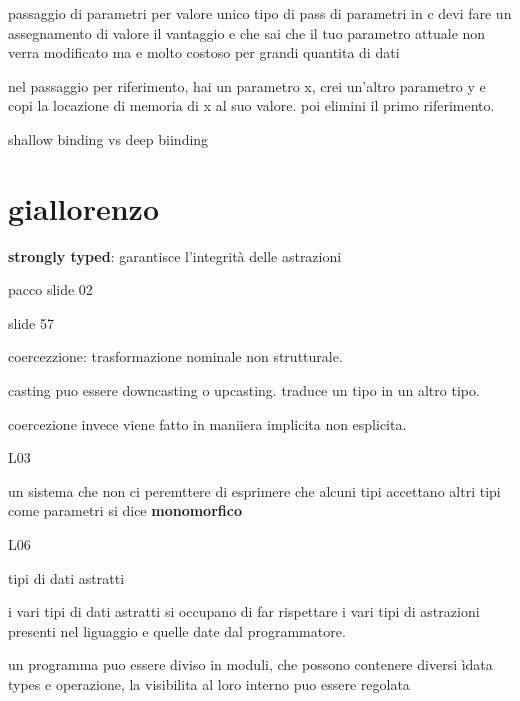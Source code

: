 \documentclass[12pt]{article}
\begin{document}
 passaggio di parametri per valore unico tipo di pass di parametri in c
 devi fare un assegnamento di valore
 il vantaggio e che sai che il tuo parametro attuale non verra modificato
 ma e molto costoso per grandi quantita di dati


nel passaggio per riferimento, hai un parametro x, crei un'altro parametro y e copi la locazione di memoria di x al suo valore. poi elimini il primo riferimento.

shallow binding vs deep biinding



\section{giallorenzo}

\textbf{strongly typed}: garantisce l'integrità delle astrazioni

 pacco slide 02

slide 57

coercezzione: trasformazione nominale non strutturale.

casting puo essere downcasting o upcasting. traduce un tipo in un altro tipo.

coercezione invece viene fatto in maniiera implicita non esplicita.

L03

un sistema che non ci peremttere di esprimere che alcuni tipi accettano altri tipi come parametri si dice \textbf{monomorfico}

L06

tipi di dati astratti

i vari tipi di dati astratti si occupano di far rispettare i vari tipi di astrazioni presenti nel liguaggio e quelle date dal programmatore.

un programma puo essere diviso in moduli, che possono contenere diversi ìdata types e operazione, la visibilita al loro interno puo essere regolata
\end{document}
